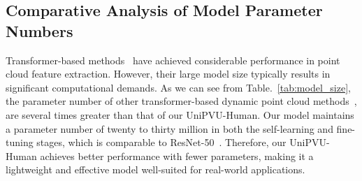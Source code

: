 \begin{appendix}
\section{Comparative Analysis of Model Parameter Numbers}
Transformer\cite{vaswani2017attention}-based methods~\cite{chen2023pointgpt,liu2023point,zhao2021point,guo2021pct} have achieved considerable performance in point cloud feature extraction. However, their large model size typically results in significant computational demands. As we can see from Table.~\ref{tab:model_size}, the parameter number of other transformer-based dynamic point cloud methods~\cite{fan2021point,fan2022point,wen2022point, shen2023masked}, are several times greater than that of our UniPVU-Human. Our model maintains a parameter number of twenty to thirty million in both the self-learning and fine-tuning stages, which is comparable to ResNet-50~\cite{he2016deep}. Therefore, our UniPVU-Human achieves better performance with fewer parameters, making it a lightweight and effective model well-suited for real-world applications. 


\end{appendix}

